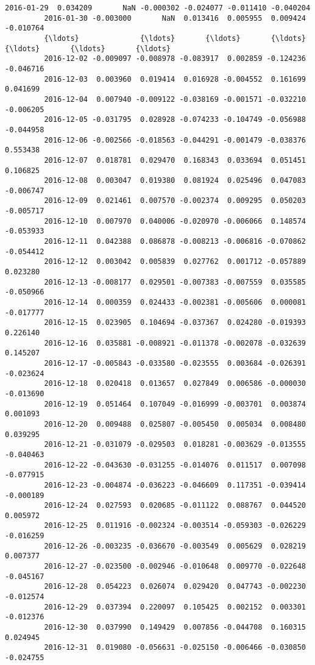 \documentclass[11pt]{article}
\begin{document}
\begin{Verbatim}[commandchars=\\\{\}]
         2016-01-29  0.034209       NaN -0.000302 -0.024077 -0.011410 -0.040204   
         2016-01-30 -0.003000       NaN  0.013416  0.005955  0.009424 -0.010764   
         {\ldots}              {\ldots}       {\ldots}       {\ldots}       {\ldots}       {\ldots}       {\ldots}   
         2016-12-02 -0.009097 -0.008978 -0.083917  0.002859 -0.124236 -0.046716   
         2016-12-03  0.003960  0.019414  0.016928 -0.004552  0.161699  0.041699   
         2016-12-04  0.007940 -0.009122 -0.038169 -0.001571 -0.032210 -0.006205   
         2016-12-05 -0.031795  0.028928 -0.074233 -0.104749 -0.056988 -0.044958   
         2016-12-06 -0.002566 -0.018563 -0.044291 -0.001479 -0.038376  0.553438   
         2016-12-07  0.018781  0.029470  0.168343  0.033694  0.051451  0.106825   
         2016-12-08  0.003047  0.019380  0.081924  0.025496  0.047083 -0.006747   
         2016-12-09  0.021461  0.007570 -0.002374  0.009295  0.050203 -0.005717   
         2016-12-10  0.007970  0.040006 -0.020970 -0.006066  0.148574 -0.053933   
         2016-12-11  0.042388  0.086878 -0.008213 -0.006816 -0.070862 -0.054412   
         2016-12-12  0.003042  0.005839  0.027762  0.001712 -0.057889  0.023280   
         2016-12-13 -0.008177  0.029501 -0.007383 -0.007559  0.035585 -0.050966   
         2016-12-14  0.000359  0.024433 -0.002381 -0.005606  0.000081 -0.017777   
         2016-12-15  0.023905  0.104694 -0.037367  0.024280 -0.019393  0.226140   
         2016-12-16  0.035881 -0.008921 -0.011378 -0.002078 -0.032639  0.145207   
         2016-12-17 -0.005843 -0.033580 -0.023555  0.003684 -0.026391 -0.023624   
         2016-12-18  0.020418  0.013657  0.027849  0.006586 -0.000030 -0.013690   
         2016-12-19  0.051464  0.107049 -0.016999 -0.003701  0.003874  0.001093   
         2016-12-20  0.009488  0.025807 -0.005450  0.005034  0.008480  0.039295   
         2016-12-21 -0.031079 -0.029503  0.018281 -0.003629 -0.013555 -0.040463   
         2016-12-22 -0.043630 -0.031255 -0.014076  0.011517  0.007098 -0.077915   
         2016-12-23 -0.004874 -0.036223 -0.046609  0.117351 -0.039414 -0.000189   
         2016-12-24  0.027593  0.020685 -0.011122  0.088767  0.044520  0.005972   
         2016-12-25  0.011916 -0.002324 -0.003514 -0.059303 -0.026229 -0.016259   
         2016-12-26 -0.003235 -0.036670 -0.003549  0.005629  0.028219  0.007377   
         2016-12-27 -0.023500 -0.002946 -0.010648  0.009770 -0.022648 -0.045167   
         2016-12-28  0.054223  0.026074  0.029420  0.047743 -0.002230 -0.012574   
         2016-12-29  0.037394  0.220097  0.105425  0.002152  0.003301 -0.012376   
         2016-12-30  0.037990  0.149429  0.007856 -0.044708  0.160315  0.024945   
         2016-12-31  0.019080 -0.056631 -0.025150 -0.006466 -0.030850 -0.024755   
         

\end{Verbatim}
\end{document}
